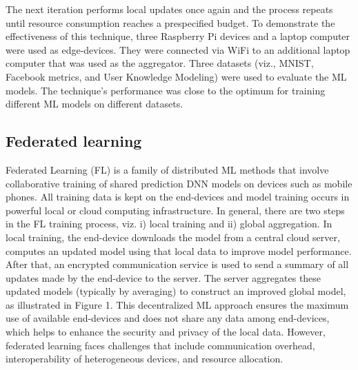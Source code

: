\documentclass[letterpaper, 10 pt, conference]{ieeeconf}
\begin{document}
The next iteration performs local updates once again and the process repeats until resource consumption reaches a prespecified budget.
To demonstrate the effectiveness of this technique, three Raspberry Pi devices and a laptop computer were used as edge-devices. They were connected via WiFi to an additional laptop computer that was used as the aggregator. Three datasets (viz., MNIST, Facebook metrics, and User Knowledge Modeling) were used to evaluate the ML models. The technique's performance was close to the optimum for training different ML models on different datasets.
\subsection{Federated learning}
Federated Learning (FL) is a family of distributed ML methods that involve collaborative training of shared prediction DNN models on devices such as mobile phones\cite{McMahan_Moore_Ramage_Hampson_Arcas_2017}. All training data is kept on the end-devices and model training occurs in powerful local or cloud computing infrastructure. In general, there are two steps in the FL training process, viz. i) local training and ii) global aggregation. In local training, the end-device downloads the model from a central cloud server, computes an updated model using that local data to improve model performance. After that, an encrypted communication service is used to send a summary of all updates made by the end-device to the server. The server aggregates these updated models (typically by averaging) to construct an improved global model, as illustrated in Figure 1. This decentralized ML approach ensures the maximum use of available end-devices and does not share any data among end-devices, which helps to enhance the security and privacy of the local data. However, federated learning faces challenges that include communication overhead, interoperability of heterogeneous devices, and resource allocation\cite{Li_Sahu_Talwalkar_Smith_2020, Lim_Luong_Hoang_Jiao_Liang_Yang_Niyato_Miao_2020}.
\end{document}
